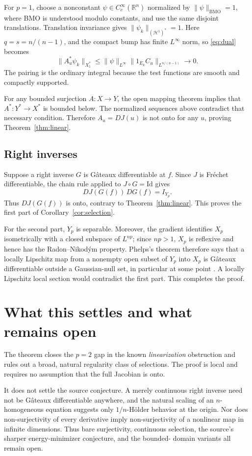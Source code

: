 \documentclass[11pt]{article}
\theoremstyle{remark}
\newcommand{\R}{\mathbb R}
\newcommand{\norm}[1]{\lVert #1\rVert}
\newcommand{\BMO}{\operatorname{BMO}}
\begin{document}
For $p=1$, choose a nonconstant $\psi\in C_c^\infty(\R^n)$ normalized by
$\norm{\psi}_{\BMO}=1$, where BMO is understood modulo constants, and use
the same disjoint translations.  Translation invariance gives
$\norm{\psi_k}_{(\mathcal H^1)^*}=1$.  Here $q=s=n/(n-1)$, and the compact
bump has finite $L^\infty$ norm, so \eqref{eq:dual} becomes
\[
 \norm{A_u^*\psi_k}_{X_1^*}
 \leq \norm{\psi}_{L^\infty}
       \norm{1_{E_k}C_u}_{L^{n/(n-1)}}\longrightarrow0.
\]
The pairing is the ordinary integral because the test functions are smooth
and compactly supported.

For any bounded surjection $A:X\to Y$, the open mapping theorem implies
that $A^*:Y^*\to X^*$ is bounded below.  The normalized sequences above
contradict that necessary condition.  Therefore $A_u=DJ(u)$ is not onto for
any $u$, proving Theorem~\ref{thm:linear}.

\subsection{Right inverses}

Suppose a right inverse $G$ is G\^ateaux differentiable at $f$.  Since $J$
is Fr\'echet differentiable, the chain rule applied to $J\circ G=\mathrm{Id}$
gives
\[
 DJ(G(f))\,DG(f)=I_{Y_p}.
\]
Thus $DJ(G(f))$ is onto, contrary to Theorem~\ref{thm:linear}.  This proves
the first part of Corollary~\ref{cor:selection}.

For the second part, $Y_p$ is separable.  Moreover, the gradient identifies
$X_p$ isometrically with a closed subspace of $L^{np}$; since $np>1$, $X_p$
is reflexive and hence has the Radon--Nikod\'ym property.  Phelps's theorem
therefore says that a locally Lipschitz map from a nonempty open subset of
$Y_p$ into $X_p$ is G\^ateaux differentiable outside a Gaussian-null set, in
particular at some point \cite{Phelps}.  A locally Lipschitz local section
would contradict the first part.  This completes the proof.

\section{What this settles and what remains open}

The theorem closes the $p=2$ gap in the known \emph{linearization} obstruction
and rules out a broad, natural regularity class of selections.  The proof is
local and requires no assumption that the full Jacobian is onto.

It does not settle the source conjecture.  A merely continuous right inverse
need not be G\^ateaux differentiable anywhere, and the natural scaling of an
$n$-homogeneous equation suggests only $1/n$-H\"older behavior at the origin.
Nor does non-surjectivity of every derivative imply non-surjectivity of a
nonlinear map in infinite dimensions.  Thus bare surjectivity, continuous
selection, the source's sharper energy-minimizer conjecture, and the bounded-
domain variants all remain open.
\end{document}
